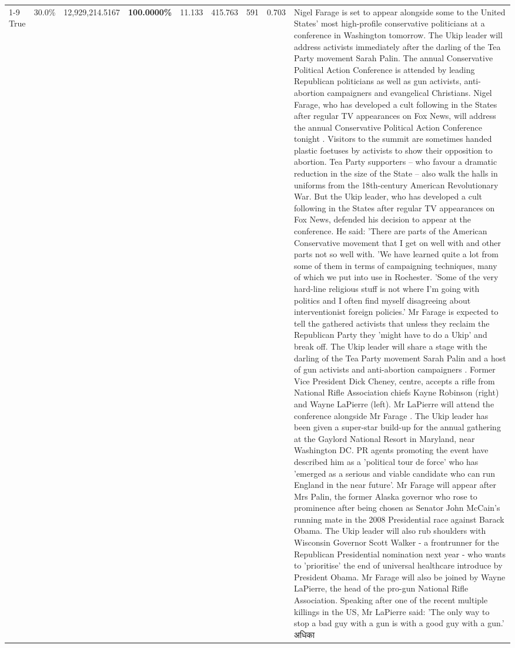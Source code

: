 \begin{table}[H]
\begin{tabular}{lllrlllll}
\cline{1-9}
True & 30.0\% & 12,929,214.5167 & \bfseries \color{red} 100.0000\% & 11.133 & 415.763 & 591 & 0.703 & Nigel Farage is set to appear alongside some to the United States' most high-profile conservative politicians at a conference in Washington tomorrow. The Ukip leader will address activists immediately after the darling of the Tea Party movement Sarah Palin. The annual Conservative Political Action Conference is attended by leading Republican politicians as well as gun activists, anti-abortion campaigners and evangelical Christians. Nigel Farage, who has developed a cult following in the States after regular TV appearances on Fox News, will address the annual Conservative Political Action Conference tonight . Visitors to the summit are sometimes handed plastic foetuses by activists to show their opposition to abortion. Tea Party supporters – who favour a dramatic reduction in the size of the State – also walk the halls in uniforms from the 18th-century American Revolutionary War. But the Ukip leader, who has developed a cult following in the States after regular TV appearances on Fox News, defended his decision to appear at the conference. He said: 'There are parts of the American Conservative movement that I get on well with and other parts not so well with. 'We have learned quite a lot from some of them in terms of campaigning techniques, many of which we put into use in Rochester. 'Some of the very hard-line religious stuff is not where I'm going with politics and I often find myself disagreeing about interventionist foreign policies.' Mr Farage is expected to tell the gathered activists that unless they reclaim the Republican Party they 'might have to do a Ukip' and break off. The Ukip leader will share a stage with the darling of the Tea Party movement Sarah Palin and a host of gun activists and anti-abortion campaigners . Former Vice President Dick Cheney, centre, accepts a rifle from National Rifle Association chiefs Kayne Robinson (right) and Wayne LaPierre (left). Mr LaPierre will attend the conference alongside Mr Farage . The Ukip leader has been given a super-star build-up for the annual gathering at the Gaylord National Resort in Maryland, near Washington DC. PR agents promoting the event have described him as a 'political tour de force' who has 'emerged as a serious and viable candidate who can run England in the near future'. Mr Farage will appear after Mrs Palin, the former Alaska governor who rose to prominence after being chosen as Senator John McCain's running mate in the 2008 Presidential race against Barack Obama. The Ukip leader will also rub shoulders with Wisconsin Governor Scott Walker - a frontrunner for the Republican Presidential nomination next year - who wants to 'prioritise' the end of universal healthcare introduce by President Obama. Mr Farage will also be joined by Wayne LaPierre, the head of the pro-gun National Rifle Association. Speaking after one of the recent multiple killings in the US, Mr LaPierre said: 'The only way to stop a bad guy with a gun is with a good guy with a gun.' अधिका \\

\end{tabular}
\end{table}
